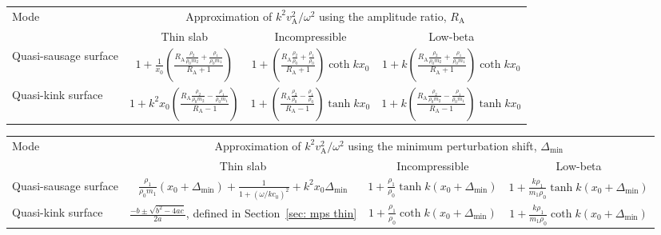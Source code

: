 \documentclass[12pt]{../style-files/ociamthesis}
\begin{document}
\begin{sidewaystable}
	\centering
	\begin{tabular}{lccc}
		\toprule
		\smallskip
		Mode & \multicolumn{3}{c}{Approximation of $k^2v_\textrm{A}^2 / \omega^2$ using the amplitude ratio, $R_\textrm{A}$} \\
		& Thin slab & Incompressible & Low-beta \\
		\midrule
		\smallskip
		Quasi-sausage surface & $ 1 + \frac{1}{x_0}\left(\frac{R_\textrm{A}\frac{\rho_2}{\rho_0m_2} + \frac{\rho_1}{\rho_0m_1}}{R_\textrm{A} + 1}\right) $ & $ 1 + \left( \frac{R_\textrm{A} \frac{\rho_2}{\rho_0} + \frac{\rho_1}{\rho_0}}{R_\textrm{A} + 1} \right) \coth{kx_0} $ & $ 1 + k \left( \frac{ R_\textrm{A}\frac{\rho_2}{\rho_0m_2} + \frac{\rho_1}{\rho_0m_1}}{R_\textrm{A} + 1} \right) \coth{kx_0} $ \\
		Quasi-kink surface & $ 1 + k^2x_0\left(\frac{R_\textrm{A}\frac{\rho_2}{\rho_0m_2} - \frac{\rho_1}{\rho_0m_1}}{R_\textrm{A} - 1}\right) $ & $ 1 + \left( \frac{R_\textrm{A} \frac{\rho_2}{\rho_0} - \frac{\rho_1}{\rho_0}}{R_\textrm{A} - 1} \right) \tanh{kx_0} $ & $ 1 + k \left( \frac{ R_\textrm{A}\frac{\rho_2}{\rho_0m_2} - \frac{\rho_1}{\rho_0m_1}}{R_\textrm{A} - 1} \right) \tanh{kx_0} $ \\
		\bottomrule
	\end{tabular}
	\caption{Magneto-seismology inversion using the amplitude ratio, $R_\textrm{A}$, to approximate the Alfv\'{e}n speed, $v_\textrm{A}$.}
	\label{table: amp ratio}

	\bigskip\bigskip\bigskip\bigskip\bigskip

	\begin{tabular}{lccc}
		\toprule
		\smallskip
		Mode & \multicolumn{3}{c}{Approximation of $k^2v_\textrm{A}^2 / \omega^2$ using the minimum perturbation shift, $\Delta_\textrm{min}$} \\
		& Thin slab & Incompressible & Low-beta \\
		\midrule
		\smallskip
		Quasi-sausage surface & $ \frac{\rho_1}{\rho_0m_1}(x_0 + \Delta_\textrm{min}) + \frac{1}{1 + (\omega / kc_0)^2} + k^2x_0\Delta_\textrm{min} $ & $ 1 + \frac{\rho_1}{\rho_0}\tanh{k(x_0 + \Delta_\textrm{min})} $ & $ 1 + \frac{k\rho_1}{m_1\rho_0}\tanh{k(x_0 + \Delta_\textrm{min})} $ \\
		Quasi-kink surface & $\frac{-b \pm \sqrt{b^2 - 4ac}}{2a}$, defined in Section~\ref{sec: mps thin} & $ 1 + \frac{\rho_1}{\rho_0}\coth{k(x_0 + \Delta_\textrm{min})} $ & $ 1 + \frac{k\rho_1}{m_1\rho_0}\coth{k(x_0 + \Delta_\textrm{min})} $ \\
		\bottomrule		
	\end{tabular}
	\caption{Magneto-seismology inversion using the minimum perturbation shift, $\Delta_\textrm{min}$, to approximate the Alfv\'{e}n speed, $v_\textrm{A}$.}
	\label{table: min pert shift}
\end{sidewaystable}
\end{document}
